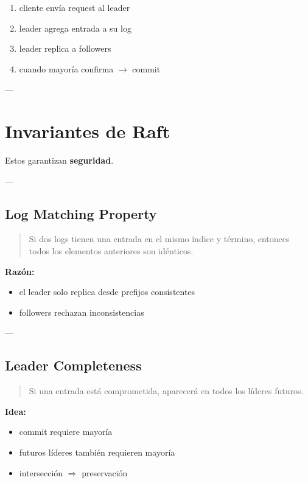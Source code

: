 \documentclass[variant=apuntes,cover=institutional,mode=screen]{ua-engineering-v6-article}
\begin{document}
\begin{enumerate}
\item cliente envía request al leader
\item leader agrega entrada a su log
\item leader replica a followers
\item cuando mayoría confirma $\to$ commit
\end{enumerate}

---

\section{Invariantes de Raft}

Estos garantizan \textbf{seguridad}.

---

\subsection{Log Matching Property}

\begin{quote}
Si dos logs tienen una entrada en el mismo índice y término, entonces todos los elementos anteriores son idénticos.
\end{quote}

\textbf{Razón:}
\begin{itemize}
\item el leader solo replica desde prefijos consistentes
\item followers rechazan inconsistencias
\end{itemize}

---

\subsection{Leader Completeness}

\begin{quote}
Si una entrada está comprometida, aparecerá en todos los líderes futuros.
\end{quote}

\textbf{Idea:}
\begin{itemize}
\item commit requiere mayoría
\item futuros líderes también requieren mayoría
\item intersección $\Rightarrow$ preservación
\end{itemize}
\end{document}
